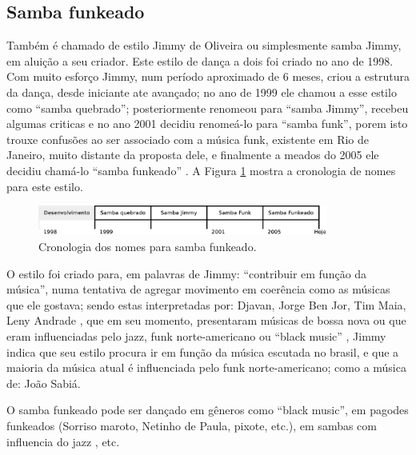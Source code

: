 \subsection{Samba funkeado}
Também é chamado de estilo Jimmy de Oliveira ou simplesmente  samba Jimmy, 
em aluição a seu criador.
Este estilo de dança a dois foi criado no ano de 1998.
Com muito esforço Jimmy, num período aproximado de 6 meses, 
criou a estrutura da dança, desde iniciante ate avançado;
no ano de 1999 ele  chamou a esse estilo como ``samba quebrado'';  
posteriormente renomeou  para ``samba Jimmy'', 
recebeu algumas criticas e no ano 2001 decidiu renomeá-lo para ``samba funk'',
porem isto trouxe confusões   ao ser associado com a música funk, existente em Rio de Janeiro,
muito distante da proposta dele, e
finalmente a meados do 2005 ele decidiu chamá-lo ``samba funkeado''  \cite{sambafunkeadoJimmyDeOliveiraPart1}.
A Figura \ref{fig:funkeadocrono1} mostra a cronologia de nomes para este estilo.
\begin{figure}[h]
  \centering
    \includegraphics[width=0.85\textwidth]{chapters/cap-historia-dancasamba/sambafunkeado.eps}
  \caption{Cronologia dos nomes para samba funkeado.}
\label{fig:funkeadocrono1}
\end{figure}

O estilo foi criado para, em palavras de Jimmy: ``contribuir em função da música'', 
numa tentativa de agregar movimento em coerência como as músicas que ele gostava;
sendo estas interpretadas por:
Djavan, Jorge Ben Jor, Tim Maia, Leny Andrade \cite{sambafunkeadoJimmyDeOliveiraPart1}, que em seu momento, 
presentaram músicas de bossa nova ou que eram influenciadas pelo jazz, 
funk norte-americano ou ``black music'' \cite{sambafunkeadoJimmyDeOliveiraPart1} \cite{sambafunkeadoJimmyDeOliveiraPart3},
Jimmy indica que seu estilo procura ir em função da música escutada no brasil, 
e que a maioria da música atual é influenciada pelo funk norte-americano;
como a música de: João Sabiá. 

O samba funkeado pode ser dançado em gêneros como ``black music'',
em pagodes funkeados (Sorriso maroto, Netinho de Paula, pixote, etc.), 
em sambas com influencia do jazz \cite{sambafunkeadoJimmyDeOliveiraPart3}, etc. 

